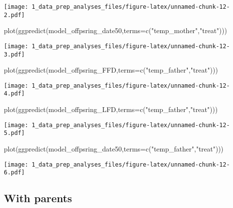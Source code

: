 \documentclass[
]{article}
\newenvironment{Shaded}{\begin{snugshade}}{\end{snugshade}}
\newcommand{\AttributeTok}[1]{\textcolor[rgb]{0.77,0.63,0.00}{#1}}
\newcommand{\FunctionTok}[1]{\textcolor[rgb]{0.00,0.00,0.00}{#1}}
\newcommand{\NormalTok}[1]{#1}
\newcommand{\StringTok}[1]{\textcolor[rgb]{0.31,0.60,0.02}{#1}}
\begin{document}
\texttt{[image: 1\_data\_prep\_analyses\_files/figure-latex/unnamed-chunk-12-2.pdf]}

\begin{Shaded}
\begin{Highlighting}[]
\FunctionTok{plot}\NormalTok{(}\FunctionTok{ggpredict}\NormalTok{(model\_offpsring\_date50,}\AttributeTok{terms=}\FunctionTok{c}\NormalTok{(}\StringTok{"temp\_mother"}\NormalTok{,}\StringTok{"treat"}\NormalTok{)))}
\end{Highlighting}
\end{Shaded}

\texttt{[image: 1\_data\_prep\_analyses\_files/figure-latex/unnamed-chunk-12-3.pdf]}

\begin{Shaded}
\begin{Highlighting}[]
\FunctionTok{plot}\NormalTok{(}\FunctionTok{ggpredict}\NormalTok{(model\_offpsring\_FFD,}\AttributeTok{terms=}\FunctionTok{c}\NormalTok{(}\StringTok{"temp\_father"}\NormalTok{,}\StringTok{"treat"}\NormalTok{)))}
\end{Highlighting}
\end{Shaded}

\texttt{[image: 1\_data\_prep\_analyses\_files/figure-latex/unnamed-chunk-12-4.pdf]}

\begin{Shaded}
\begin{Highlighting}[]
\FunctionTok{plot}\NormalTok{(}\FunctionTok{ggpredict}\NormalTok{(model\_offpsring\_LFD,}\AttributeTok{terms=}\FunctionTok{c}\NormalTok{(}\StringTok{"temp\_father"}\NormalTok{,}\StringTok{"treat"}\NormalTok{)))}
\end{Highlighting}
\end{Shaded}

\texttt{[image: 1\_data\_prep\_analyses\_files/figure-latex/unnamed-chunk-12-5.pdf]}

\begin{Shaded}
\begin{Highlighting}[]
\FunctionTok{plot}\NormalTok{(}\FunctionTok{ggpredict}\NormalTok{(model\_offpsring\_date50,}\AttributeTok{terms=}\FunctionTok{c}\NormalTok{(}\StringTok{"temp\_father"}\NormalTok{,}\StringTok{"treat"}\NormalTok{)))}
\end{Highlighting}
\end{Shaded}

\texttt{[image: 1\_data\_prep\_analyses\_files/figure-latex/unnamed-chunk-12-6.pdf]}

\hypertarget{with-parents}{%
\subsection{With parents}\label{with-parents}}
\end{document}
